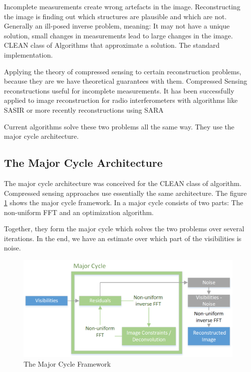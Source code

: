 Incomplete measurements create wrong artefacts in the image. Reconstructing the image is finding out which structures are plausible and which are not. Generally an ill-posed inverse problem, meaning: It may not have a unique solution, small changes in measurements lead to large changes in the image.  CLEAN class of Algorithms that approximate a solution. The standard implementation.

Applying the theory of compressed sensing to certain reconstruction problems, because they are we have theoretical guarantees with them. 
Compressed Sensing\cite{candes2006robust}\cite{donoho2006compressed} reconstructions useful for incomplete measurements. It has been successfully applied to image reconstruction for radio interferometers with algorithms like SASIR \cite{starck2015starlet} or more recently reconstructions using SARA \cite{dabbech2018cygnus} \cite{birdi2018sparse}


Current algorithms solve these two problems all the same way. They use the major cycle architecture.


\subsection{The Major Cycle Architecture}
The major cycle architecture was conceived for the CLEAN class of algorithm. Compressed sensing approaches use essentially the same architecture. The figure \ref{intro:major} shows the major cycle framework. In a major cycle consists of two parts: The non-uniform FFT and an optimization algorithm.

Together, they form the major cycle which solves the two problems over several iterations. In the end, we have an estimate over which part of the visibilities is noise.

\begin{figure}
	\centering
	\vspace{-10pt}
	\includegraphics[width=1.0\linewidth]{./chapters/01.intro/Major-Minor.png}
	\caption{The Major Cycle Framework}
	\label{intro:major}
	\vspace{-10pt}
\end{figure}

